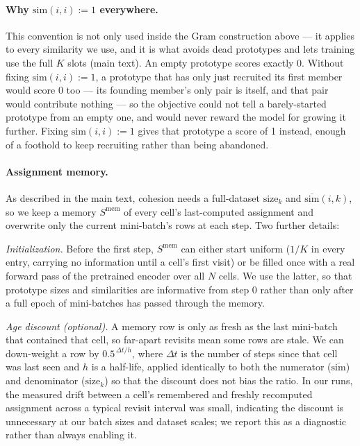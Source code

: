 \paragraph{Why $\mathrm{sim}(i,i):=1$ everywhere.}
This convention is not only used inside the Gram construction above --- it applies to every similarity we use, and it is what avoids dead prototypes and lets training use the full $K$ slots (main text). An empty prototype scores exactly 0. Without fixing $\mathrm{sim}(i,i):=1$, a prototype that has only just recruited its first member would score 0 too --- its founding member's only pair is itself, and that pair would contribute nothing --- so the objective could not tell a barely-started prototype from an empty one, and would never reward the model for growing it further. Fixing $\mathrm{sim}(i,i):=1$ gives that prototype a score of 1 instead, enough of a foothold to keep recruiting rather than being abandoned.

\paragraph{Assignment memory.}
As described in the main text, cohesion needs a full-dataset $\mathrm{size}_k$ and $\overline{\mathrm{sim}}(i,k)$, so we keep a memory $S^{\text{mem}}$ of every cell's last-computed assignment and overwrite only the current mini-batch's rows at each step. Two further details:

\emph{Initialization.} Before the first step, $S^{\text{mem}}$ can either start uniform ($1/K$ in every entry, carrying no information until a cell's first visit) or be filled once with a real forward pass of the pretrained encoder over all $N$ cells. We use the latter, so that prototype sizes and similarities are informative from step 0 rather than only after a full epoch of mini-batches has passed through the memory.

\emph{Age discount (optional).} A memory row is only as fresh as the last mini-batch that contained that cell, so far-apart revisits mean some rows are stale. We can down-weight a row by $0.5^{\,\Delta t/h}$, where $\Delta t$ is the number of steps since that cell was last seen and $h$ is a half-life, applied identically to both the numerator ($\overline{\mathrm{sim}}$) and denominator ($\mathrm{size}_k$) so that the discount does not bias the ratio. In our runs, the measured drift between a cell's remembered and freshly recomputed assignment across a typical revisit interval was small, indicating the discount is unnecessary at our batch sizes and dataset scales; we report this as a diagnostic rather than always enabling it.

